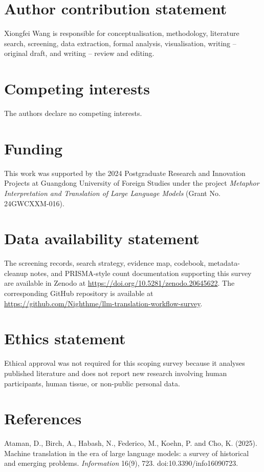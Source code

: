 \documentclass[11pt]{article}
\begin{document}
\section*{Author contribution statement}
Xiongfei Wang is responsible for conceptualisation, methodology, literature search, screening, data extraction, formal analysis, visualisation, writing -- original draft, and writing -- review and editing.

\section*{Competing interests}
The authors declare no competing interests.

\section*{Funding}
This work was supported by the 2024 Postgraduate Research and Innovation Projects at Guangdong University of Foreign Studies under the project \emph{Metaphor Interpretation and Translation of Large Language Models} (Grant No. 24GWCXXM-016).

\section*{Data availability statement}
The screening records, search strategy, evidence map, codebook, metadata-cleanup notes, and PRISMA-style count documentation supporting this survey are available in Zenodo at \url{https://doi.org/10.5281/zenodo.20645622}. The corresponding GitHub repository is available at \url{https://github.com/Nighthme/llm-translation-workflow-survey}.

\section*{Ethics statement}
Ethical approval was not required for this scoping survey because it analyses published literature and does not report new research involving human participants, human tissue, or non-public personal data.

\section*{References}
\footnotesize
\RaggedRight
Ataman, D., Birch, A., Habash, N., Federico, M., Koehn, P. and Cho, K. (2025). Machine translation in the era of large language models: a survey of historical and emerging problems. \emph{Information} 16(9), 723. doi:10.3390/info16090723.
\end{document}
